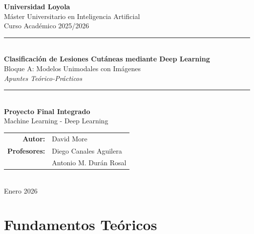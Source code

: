 \documentclass[12pt,a4paper]{article}
\begin{document}
\begin{titlepage}
    \centering
    \vspace*{1cm}

    {\Large \textbf{Universidad Loyola}}\\[0.5cm]
    {\large Máster Universitario en Inteligencia Artificial}\\[0.3cm]
    {\large Curso Académico 2025/2026}\\[2cm]

    \rule{\textwidth}{1.5pt}\\[0.5cm]
    {\Huge \textbf{Clasificación de Lesiones Cutáneas mediante Deep Learning}}\\[0.3cm]
    {\Large Bloque A: Modelos Unimodales con Imágenes}\\[0.3cm]
    {\large \textit{Apuntes Teórico-Prácticos}}\\[0.5cm]
    \rule{\textwidth}{1.5pt}\\[2cm]

    {\large \textbf{Proyecto Final Integrado}}\\[0.3cm]
    {\large Machine Learning - Deep Learning}\\[2cm]

    \begin{tabular}{rl}
        \textbf{Autor:} & David More \\[0.3cm]
        \textbf{Profesores:} & Diego Canales Aguilera \\
        & Antonio M. Durán Rosal \\
    \end{tabular}\\[3cm]

    \vfill
    {\large Enero 2026}
\end{titlepage}

\tableofcontents
\newpage

\part{Fundamentos Teóricos}

\end{document}
